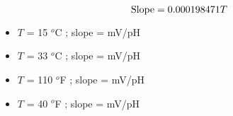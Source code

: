 $$\hbox{Slope} = 0.000198471 T$$

\begin{itemize}
\item{} $T$ = 15 $^{o}$C ; slope =  mV/pH
\vskip 5pt
\item{} $T$ = 33 $^{o}$C ; slope =  mV/pH
\vskip 5pt
\item{} $T$ = 110 $^{o}$F ; slope =  mV/pH
\vskip 5pt
\item{} $T$ = 40 $^{o}$F ; slope =  mV/pH
\end{itemize}




